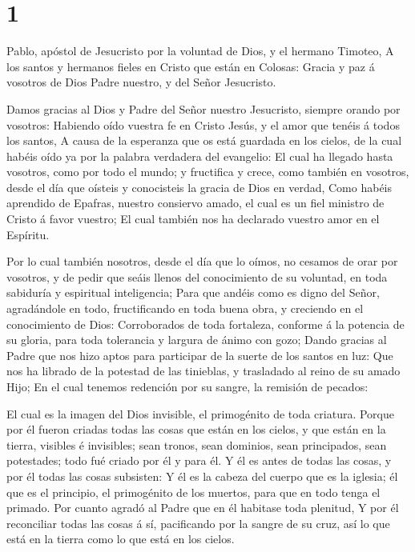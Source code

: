 \hypertarget{section}{%
\section{1}\label{section}}

 Pablo, apóstol de Jesucristo por la voluntad de Dios, y el
hermano Timoteo,  A los santos y hermanos fieles en Cristo
que están en Colosas: Gracia y paz á vosotros de Dios Padre nuestro, y
del Señor Jesucristo.

 Damos gracias al Dios y Padre del Señor nuestro Jesucristo,
siempre orando por vosotros:  Habiendo oído vuestra fe en
Cristo Jesús, y el amor que tenéis á todos los santos,  A
causa de la esperanza que os está guardada en los cielos, de la cual
habéis oído ya por la palabra verdadera del evangelio:  El
cual ha llegado hasta vosotros, como por todo el mundo; y fructifica y
crece, como también en vosotros, desde el día que oísteis y conocisteis
la gracia de Dios en verdad,  Como habéis aprendido de
Epafras, nuestro consiervo amado, el cual es un fiel ministro de Cristo
á favor vuestro;  El cual también nos ha declarado vuestro
amor en el Espíritu.

 Por lo cual también nosotros, desde el día que lo oímos, no
cesamos de orar por vosotros, y de pedir que seáis llenos del
conocimiento de su voluntad, en toda sabiduría y espiritual
inteligencia;  Para que andéis como es digno del Señor,
agradándole en todo, fructificando en toda buena obra, y creciendo en el
conocimiento de Dios:  Corroborados de toda fortaleza,
conforme á la potencia de su gloria, para toda tolerancia y largura de
ánimo con gozo;  Dando gracias al Padre que nos hizo aptos
para participar de la suerte de los santos en luz:  Que nos
ha librado de la potestad de las tinieblas, y trasladado al reino de su
amado Hijo;  En el cual tenemos redención por su sangre, la
remisión de pecados:

 El cual es la imagen del Dios invisible, el primogénito de
toda criatura.  Porque por él fueron criadas todas las
cosas que están en los cielos, y que están en la tierra, visibles é
invisibles; sean tronos, sean dominios, sean principados, sean
potestades; todo fué criado por él y para él.  Y él es
antes de todas las cosas, y por él todas las cosas subsisten:
 Y él es la cabeza del cuerpo que es la iglesia; él que es
el principio, el primogénito de los muertos, para que en todo tenga el
primado.  Por cuanto agradó al Padre que en él habitase
toda plenitud,  Y por él reconciliar todas las cosas á sí,
pacificando por la sangre de su cruz, así lo que está en la tierra como
lo que está en los cielos.

